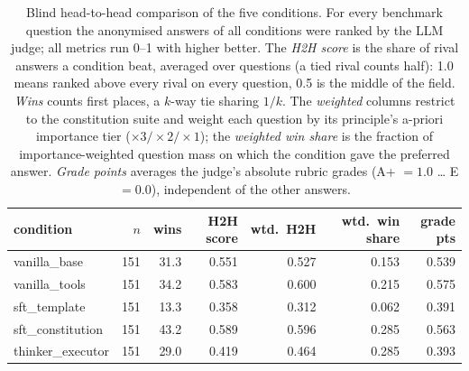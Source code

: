 \begin{table}[t]
  \centering
  \caption{Blind head-to-head comparison of the five conditions. For every benchmark question the anonymised answers of all conditions were ranked by the LLM judge; all metrics run 0--1 with higher better. The \emph{H2H score} is the share of rival answers a condition beat, averaged over questions (a tied rival counts half): 1.0 means ranked above every rival on every question, 0.5 is the middle of the field. \emph{Wins} counts first places, a $k$-way tie sharing $1/k$. The \emph{weighted} columns restrict to the constitution suite and weight each question by its principle's a-priori importance tier ($\times 3/\times 2/\times 1$); the \emph{weighted win share} is the fraction of importance-weighted question mass on which the condition gave the preferred answer. \emph{Grade points} averages the judge's absolute rubric grades (A+ $=1.0$ \ldots{} E $=0.0$), independent of the other answers.}
  \label{tab:rank-overall}
  \begin{tabular}{lrrrrrr}
    \toprule
    condition & $n$ & wins & H2H score & wtd.\ H2H & wtd.\ win share & grade pts \\
    \midrule
    vanilla\_base & 151 & 31.3 & 0.551 & 0.527 & 0.153 & 0.539 \\
    vanilla\_tools & 151 & 34.2 & 0.583 & 0.600 & 0.215 & 0.575 \\
    sft\_template & 151 & 13.3 & 0.358 & 0.312 & 0.062 & 0.391 \\
    sft\_constitution & 151 & 43.2 & 0.589 & 0.596 & 0.285 & 0.563 \\
    thinker\_executor & 151 & 29.0 & 0.419 & 0.464 & 0.285 & 0.393 \\
    \bottomrule
  \end{tabular}
\end{table}
